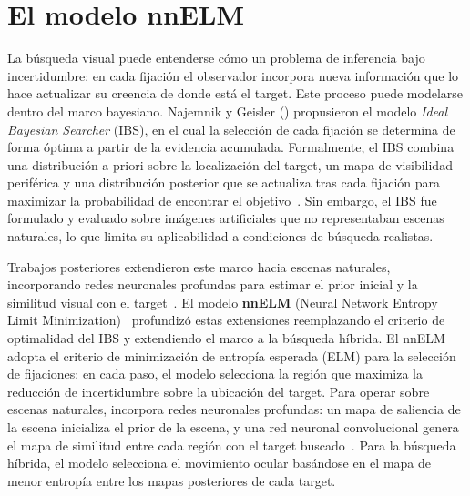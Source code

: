 \section{El modelo nnELM}
\label{sec:modelo_nnelm}


La búsqueda visual puede entenderse cómo un problema de inferencia bajo incertidumbre:
en cada fijación el observador incorpora nueva información que lo hace actualizar su creencia de donde está el target. Este proceso puede modelarse dentro del marco bayesiano. Najemnik y Geisler (\citeyear{najemnik2005}) propusieron el modelo \textit{Ideal Bayesian Searcher} (IBS), en el cual la selección de cada fijación se determina de forma óptima a partir de la evidencia acumulada. Formalmente, el IBS combina una distribución a
priori sobre la localización del target, un mapa de visibilidad periférica y
una distribución posterior que se actualiza tras cada fijación para maximizar
la probabilidad de encontrar el objetivo~\citep{bujia2022}. Sin embargo, el IBS fue formulado y
evaluado sobre imágenes artificiales que no representaban escenas
naturales, lo que limita su aplicabilidad a condiciones de búsqueda realistas.

Trabajos posteriores extendieron este marco hacia escenas naturales, incorporando redes neuronales profundas para estimar el prior inicial y la similitud visual con el target~\citep{bujia2022}. El modelo \textbf{nnELM} (Neural Network Entropy Limit Minimization)~\citep{ruarte2025} profundizó estas extensiones reemplazando el criterio de optimalidad del IBS y extendiendo el marco a la búsqueda híbrida. El nnELM adopta el criterio de minimización de entropía esperada (ELM) para la selección de fijaciones: en cada paso, el modelo selecciona la región que maximiza la reducción de incertidumbre sobre la ubicación del target. Para operar sobre escenas naturales, incorpora redes neuronales profundas: un mapa de saliencia de la escena inicializa el prior de la escena, y una red neuronal convolucional genera el mapa de similitud entre cada región con el target buscado~\citep{bujia2022}. Para la búsqueda híbrida, el modelo selecciona el movimiento ocular basándose en el mapa de menor entropía entre los mapas posteriores de cada target.
